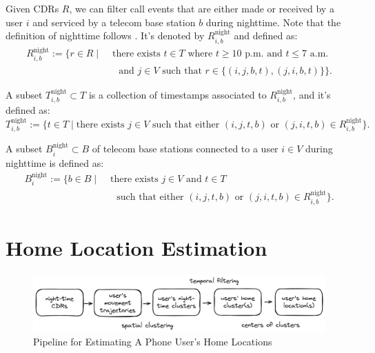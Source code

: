 \begin{definition}
Given CDRs $R$, we can filter call events that are either made or received by a user $i$ and serviced by a telecom base station $b$ during nighttime.
Note that the definition of nighttime follows \cite{referral_effect_2023aer}. It's denoted by $R^{\text{night}}_{i, b}$ and defined as:
\begin{align*}
R^{\text{night}}_{i, b}
:=
\{
    r \in R
    \mid
    &\text{ there exists }
        t \in T \text{ where }
            t \geq \text{10 p.m.}
            \text{ and } t \leq \text{7 a.m.} \\
    &\quad \text{and }
        j \in V
    \text{ such that }
        r \in \{(i, j, b, t), (j, i, b, t) \}
 \}.
\end{align*}
\end{definition}

\begin{definition}
A subset $T^{\text{night}}_{i, b} \subset T$ is a collection of timestamps associated to $R^{\text{night}}_{i, b}$, and it's defined as:
$$
T^{\text{night}}_{i, b} :=
\{
    t \in T
    \mid
    \text{there exists }
        j \in V
    \text{ such that }
        \text{either } (i, j, t, b)
        \text{ or } (j, i, t, b) \in R^{\text{night}}_{i, b}
\}.
$$
\end{definition}

\begin{definition}
A subset $B^{\text{night}}_i \subset B$ of telecom base stations connected to a user $i \in V$ during nighttime is defined as:
\begin{align*}
B^{\text{night}}_i := \{
    b \in B
    \mid
    &\text{ there exists } j \in V \text{ and } t \in T \\
    &\quad \text{such that either } (i, j, t, b) \text{ or } (j, i, t, b) \in R^{\text{night}}_{i, b}
\}.
\end{align*}
\end{definition}


\section{Home Location Estimation}\label{sec:estimation_of_residential_location}
\begin{figure}[h!]
\centering
\caption{Pipeline for Estimating A Phone User's Home Locations}
\vspace{0.1cm}

\includegraphics[scale=0.088]{figures/pipeline_home_locations.png}


\label{fig:pipeline_home_location}
\end{figure}

